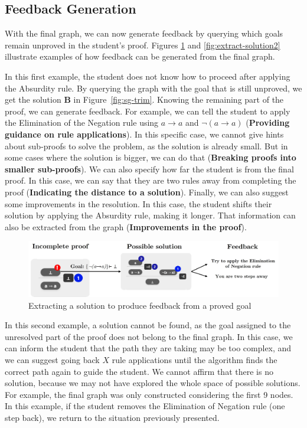 \subsection{Feedback Generation}
With the final graph, we can now generate feedback by querying which goals remain unproved in the student's proof. Figures \ref{fig:extract-solution} and \ref{fig:extract-solution2} illustrate examples of how feedback can be generated from the final graph.

In this first example, the student does not know how to proceed after applying the Absurdity rule. By querying the  graph with the goal that is still unproved, we get the solution \textbf{B} in Figure~\ref{fig:sg-trim}. Knowing the remaining part of the proof, we can generate feedback. For example, we can tell the student to apply the Elimination of the Negation rule using \(a \to a \) and  \(\lnot(a \to a) \) (\textbf{Providing guidance on rule applications}). In this specific case, we cannot give hints about sub-proofs to solve the problem, as the solution is already small. But in some cases where the solution is bigger, we can do that (\textbf{Breaking proofs into smaller sub-proofs}). We can also specify how far the student is from the final proof. In this case, we can say that they are two rules away from completing the proof (\textbf{Indicating the distance to a solution}). Finally, we can also suggest some improvements in the resolution. In this case, the student shifts their solution by applying the Absurdity rule, making it longer. That information can also be extracted from the graph (\textbf{Improvements in the proof}).

\begin{figure}
    \centering
    \includegraphics[width=1\linewidth]{resources/trim-pos-feed.jpg}
    \caption{Extracting a solution to produce feedback from a proved goal}
    \label{fig:extract-solution}
\end{figure}

In this second example, a solution cannot be found, as the goal assigned to the unresolved part of the proof does not belong to the final graph. In this case, we can inform the student that the path they are taking may be too complex, and we can suggest going back \(X\) rule applications until the algorithm finds the correct path again to guide the student. We cannot affirm that there is no solution, because we may not have explored the whole space of possible solutions. For example, the final graph was only constructed considering the first 9 nodes. In this example, if the student removes the Elimination of Negation rule (one step back), we return to the situation previously presented.

